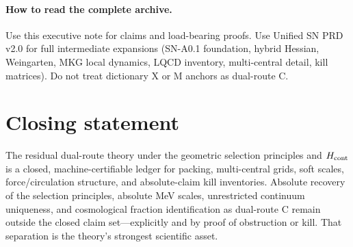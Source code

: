 \documentclass[11pt,a4paper]{article}
\theoremstyle{remark}
\begin{document}
\paragraph{How to read the complete archive.}
Use this executive note for claims and load-bearing proofs. Use Unified SN PRD v2.0 for full intermediate expansions (SN-A0.1 foundation, hybrid Hessian, Weingarten, MKG local dynamics, LQCD inventory, multi-central detail, kill matrices). Do not treat dictionary X or M anchors as dual-route C.

\section*{Closing statement}
The residual dual-route theory under the geometric selection principles and $H_{\rm cont}$ is a closed, machine-certifiable ledger for packing, multi-central grids, soft scales, force/circulation structure, and absolute-claim kill inventories. Absolute recovery of the selection principles, absolute MeV scales, unrestricted continuum uniqueness, and cosmological fraction identification as dual-route C remain outside the closed claim set---explicitly and by proof of obstruction or kill. That separation is the theory's strongest scientific asset.
\end{document}
